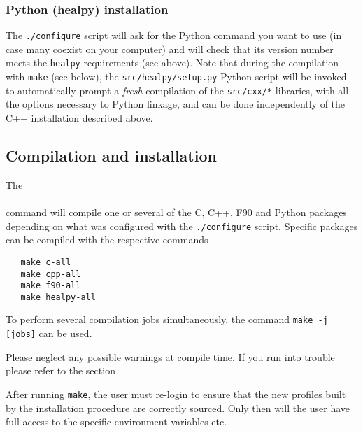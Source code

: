 \documentclass[12pt,twoside]{article}
\begin{document}
\subsubsection{Python (healpy) installation}
The {\tt ./configure} script will ask for the Python command you want to use 
(in case many coexist on your computer) and will check that its version number meets the {\tt healpy} requirements (see above).
Note that during the compilation with {\tt make} (see below), the 
 {\tt src/healpy/setup.py} Python script will be invoked to automatically prompt a {\em fresh} compilation of the
 {\tt src/cxx/*} libraries, with all the options necessary to Python linkage, and
 can be done independently of the C++ installation described above.

\subsection{Compilation and installation}

The \\
 \\
command will compile one or several of the C, C++, F90 and Python packages
depending on what was configured with the {\tt ./configure} script.
Specific packages can be compiled with the respective commands 
\begin{verbatim}
   make c-all
   make cpp-all
   make f90-all
   make healpy-all
\end{verbatim}

To perform several compilation jobs simultaneously, the command {\tt make -j [jobs]}
can be used.

Please neglect any possible warnings at compile time. If you run into
trouble please refer to the section .

After running {\tt make}, the user must re-login to ensure that the new profiles built by the installation
procedure are correctly sourced. Only then will the
user have full access to the specific \healpix
environment variables etc.
\end{document}

